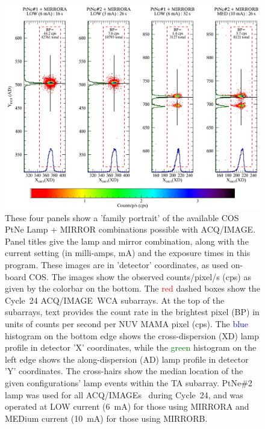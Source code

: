 \documentclass[12pt]{reportj}
\newcommand*{\myfont}{\fontfamily{rm}\selectfont}
\def\acqimage{{\myfont ACQ/IMAGE}\rm}
\def\acqimages{{\myfont ACQ/IMAGE{\rm s}}\rm}
\begin{document}
\begin{description}
\begin{figure}[!h]
	\centering
	\includegraphics[width=\textwidth]{C24_14857_FP.png}
	\caption{These four panels show a 'family portrait' of the available COS PtNe Lamp + MIRROR combinations possible with ACQ/IMAGE. Panel titles give the lamp and mirror combination, along with the current setting (in milli-amps, mA) and the exposure times in this program.
	These images are in 'detector' coordinates, as used on-board COS.
	The images show the observed counts/pixel/s (cps) as given by the colorbar on the bottom.
	The \textcolor{red}{red} dashed boxes show the Cycle~24 \acqimage~WCA subarrays. At the top of the subarrays, text provides the count rate in the brightest pixel (BP) in units of counts per second per NUV MAMA pixel (cps).
	The \textcolor{blue}{blue} histogram on the bottom edge shows the cross-dispersion (XD) lamp profile in detector 'X' coordinates, while
	the \textcolor{green}{green} histogram on the left edge shows the along-dispersion (AD) lamp profile in detector 'Y' coordinates.
	The cross-hairs show the median location of the given configurations' lamp events within the TA subarray.
	PtNe\#2 lamp was used for all \acqimages~ during Cycle~24, and was operated at LOW current (6~mA) for those using MIRRORA and MEDium current (10~mA) for those using MIRRORB.
	}
	\label{fig:FP}
	\vspace{1.3cm}
	\end{figure}

\end{description}
\end{document}
